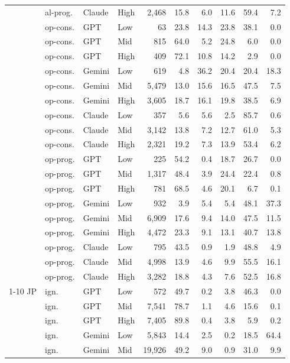 \begin{table}[t]
\begin{tabular}{llllrrrrrr}
 & al-prog. & Claude & High & 2{,}468 & 15.8 & 6.0 & 11.6 & 59.4 & 7.2 \\
 & op-cons. & GPT & Low & 63 & 23.8 & 14.3 & 23.8 & 38.1 & 0.0 \\
 & op-cons. & GPT & Mid & 815 & 64.0 & 5.2 & 24.8 & 6.0 & 0.0 \\
 & op-cons. & GPT & High & 409 & 72.1 & 10.8 & 14.2 & 2.9 & 0.0 \\
 & op-cons. & Gemini & Low & 619 & 4.8 & 36.2 & 20.4 & 20.4 & 18.3 \\
 & op-cons. & Gemini & Mid & 5{,}479 & 13.0 & 15.6 & 16.5 & 47.5 & 7.5 \\
 & op-cons. & Gemini & High & 3{,}605 & 18.7 & 16.1 & 19.8 & 38.5 & 6.9 \\
 & op-cons. & Claude & Low & 357 & 5.6 & 5.6 & 2.5 & 85.7 & 0.6 \\
 & op-cons. & Claude & Mid & 3{,}142 & 13.8 & 7.2 & 12.7 & 61.0 & 5.3 \\
 & op-cons. & Claude & High & 2{,}321 & 19.2 & 7.3 & 13.9 & 53.4 & 6.2 \\
 & op-prog. & GPT & Low & 225 & 54.2 & 0.4 & 18.7 & 26.7 & 0.0 \\
 & op-prog. & GPT & Mid & 1{,}317 & 48.4 & 3.9 & 24.4 & 22.4 & 0.8 \\
 & op-prog. & GPT & High & 781 & 68.5 & 4.6 & 20.1 & 6.7 & 0.1 \\
 & op-prog. & Gemini & Low & 932 & 3.9 & 5.4 & 5.4 & 48.1 & 37.3 \\
 & op-prog. & Gemini & Mid & 6{,}909 & 17.6 & 9.4 & 14.0 & 47.5 & 11.5 \\
 & op-prog. & Gemini & High & 4{,}472 & 23.3 & 9.1 & 13.1 & 40.7 & 13.8 \\
 & op-prog. & Claude & Low & 795 & 43.5 & 0.9 & 1.9 & 48.8 & 4.9 \\
 & op-prog. & Claude & Mid & 4{,}998 & 13.9 & 4.6 & 9.9 & 55.5 & 16.1 \\
 & op-prog. & Claude & High & 3{,}282 & 18.8 & 4.3 & 7.6 & 52.5 & 16.8 \\
\cmidrule(lr){1-10}
JP & ign. & GPT & Low & 572 & 49.7 & 0.2 & 3.8 & 46.3 & 0.0 \\
 & ign. & GPT & Mid & 7{,}541 & 78.7 & 1.1 & 4.6 & 15.6 & 0.1 \\
 & ign. & GPT & High & 7{,}405 & 89.8 & 0.4 & 3.8 & 5.9 & 0.2 \\
 & ign. & Gemini & Low & 5{,}843 & 14.4 & 2.5 & 0.2 & 18.5 & 64.4 \\
 & ign. & Gemini & Mid & 19{,}926 & 49.2 & 9.0 & 0.9 & 31.0 & 9.9 \\

\end{tabular}
\end{table}
